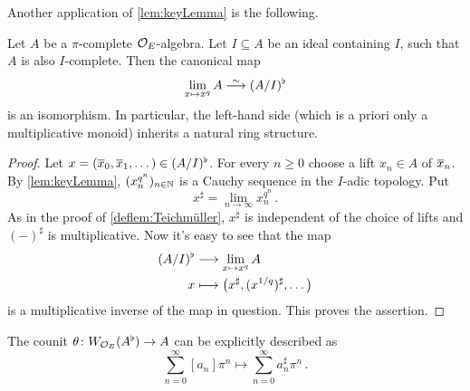 Another application of \cref{lem:keyLemma} is the following.
\begin{prop}\label{prop:(A/I)b}
	Let $A$ be a $\pi$-complete $\mathcal{O}_E$-algebra. Let $I\subseteq A$ be an ideal containing $I$, such that $A$ is also $I$-complete. Then the canonical map
	\begin{equation*}
		\lim_{x\mapsto x^q}A\isomorphism (A/I)^\flat
	\end{equation*}
	is an isomorphism. In particular, the left-hand side (which is a priori only a multiplicative monoid) inherits a natural ring structure.
\end{prop}
\begin{proof}
	Let $x=(\ov{x}_0,\ov{x}_1,\dotsc)\in (A/I)^\flat$. For every $n\geq 0$ choose a lift $x_n\in A$ of $\ov{x}_n$. By \cref{lem:keyLemma}, $(x_n^{q^n})_{n\in\mathbb{N}}$ is a Cauchy sequence in the $I$-adic topology. Put
	\begin{equation*}
		x^\sharp=\lim_{n\to\infty}x_n^{q^n}\,.
	\end{equation*}
	As in the proof of \cref{deflem:Teichmüller}, $x^\sharp$ is independent of the choice of lifts and $(-)^\sharp$ is multiplicative. Now it's easy to see that the map
	\begin{align*}
		(A/I)^\flat&\morphism \lim_{x\mapsto x^q}A\\
		x&\longmapsto \big(x^\sharp,(x^{1/q})^\sharp,\dotsc\big)
	\end{align*}
	is a multiplicative inverse of the map in question. This proves the assertion.
\end{proof}
\begin{lem}\label{lem:WAb->A}
	The counit $\theta\colon W_{\Oo_E}(A^\flat)\morphism A$ can be explicitly described as 
	\begin{equation*}
		\sum_{n=0}^\infty[a_n]\pi^n\longmapsto \sum_{n=0}^\infty a_n^\sharp \pi^n\,.
	\end{equation*}
\end{lem}
